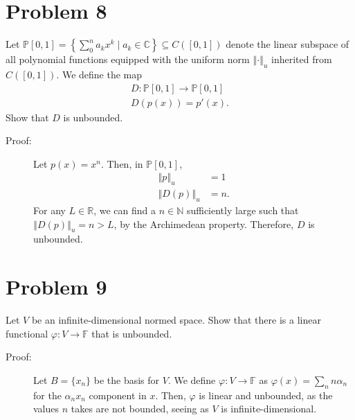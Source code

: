 \documentclass[8pt]{extarticle}
\newcommand{\N}{\mathbb{N}}
\newcommand{\R}{\mathbb{R}}
\newcommand{\C}{\mathbb{C}}
\newcommand{\norm}[1]{\left\Vert #1\right\Vert}
\begin{document}
  \section{Problem 8}%
  Let $\mathbb{P}[0,1] = \left\{\sum_{0}^{n}a_kx^k\mid a_k\in\C\right\}\subseteq C([0,1])$ denote the linear subspace of all polynomial functions equipped with the uniform norm $\norm{\cdot}_{u}$ inherited from $C([0,1])$. We define the map
  \begin{align*}
    D:\mathbb{P}[0,1]\rightarrow \mathbb{P}[0,1]\\
    D(p(x)) = p'(x).
  \end{align*}
  Show that $D$ is unbounded.
  \begin{description}
    \item[Proof:] Let $p(x) = x^n$. Then, in $\mathbb{P}[0,1]$,
      \begin{align*}
        \norm{p}_u &= 1\\
        \norm{D(p)}_u &= n.
      \end{align*}
      For any $L\in \R$, we can find a $n\in \N$ sufficiently large such that $\norm{D(p)}_u = n > L$, by the Archimedean property. Therefore, $D$ is unbounded.
  \end{description}
  \section{Problem 9}%
  Let $V$ be an infinite-dimensional normed space. Show that there is a linear functional $\varphi: V\rightarrow \mathbb{F}$ that is unbounded.
  \begin{description}
    \item[Proof:] Let $B = \{x_n\}$ be the basis for $V$. We define $\varphi: V\rightarrow \mathbb{F}$ as $\varphi(x) = \sum_{n} n\alpha_n$ for the $\alpha_nx_n$ component in $x$. Then, $\varphi$ is linear and unbounded, as the values $n$ takes are not bounded, seeing as $V$ is infinite-dimensional.
  \end{description}
\end{document}
